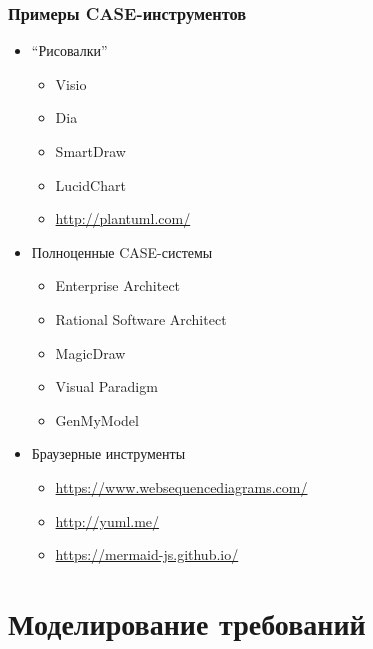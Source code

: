 \documentclass[xetex,mathserif,serif]{beamer}
\begin{document}
    \begin{frame}
        \frametitle{Примеры CASE-инструментов}
        \begin{itemize}
            \item ``Рисовалки''
            \begin{itemize}
                \item Visio
                \item Dia
                \item SmartDraw
                \item LucidChart
                \item \url{http://plantuml.com/}
            \end{itemize}
            \item Полноценные CASE-системы
            \begin{itemize}
                \item Enterprise Architect
                \item Rational Software Architect
                \item MagicDraw
                \item Visual Paradigm
                \item GenMyModel
            \end{itemize}
            \item Браузерные инструменты
            \begin{itemize}
                \item \url{https://www.websequencediagrams.com/}
                \item \url{http://yuml.me/}
		\item \url{https://mermaid-js.github.io/}
            \end{itemize}
        \end{itemize}
    \end{frame}

    \section{Моделирование требований}
\end{document}
